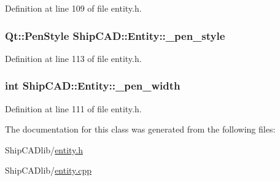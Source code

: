 Definition at line 109 of file entity.\+h.

\subsubsection[{\texorpdfstring{\+\_\+pen\+\_\+style}{_pen_style}}]{\setlength{\rightskip}{0pt plus 5cm}Qt\+::\+Pen\+Style Ship\+C\+A\+D\+::\+Entity\+::\+\_\+pen\+\_\+style\hspace{0.3cm}{\ttfamily [protected]}}\hypertarget{classShipCAD_1_1Entity_ac53123be976cd9739ad1657573d67d97}{}\label{classShipCAD_1_1Entity_ac53123be976cd9739ad1657573d67d97}


Definition at line 113 of file entity.\+h.

\subsubsection[{\texorpdfstring{\+\_\+pen\+\_\+width}{_pen_width}}]{\setlength{\rightskip}{0pt plus 5cm}int Ship\+C\+A\+D\+::\+Entity\+::\+\_\+pen\+\_\+width\hspace{0.3cm}{\ttfamily [protected]}}\hypertarget{classShipCAD_1_1Entity_a5a9892a0d84d2cfdcd3a5dabf662a595}{}\label{classShipCAD_1_1Entity_a5a9892a0d84d2cfdcd3a5dabf662a595}


Definition at line 111 of file entity.\+h.



The documentation for this class was generated from the following files\+:\begin{DoxyCompactItemize}
\item 
Ship\+C\+A\+Dlib/\hyperlink{entity_8h}{entity.\+h}\item 
Ship\+C\+A\+Dlib/\hyperlink{entity_8cpp}{entity.\+cpp}\end{DoxyCompactItemize}
